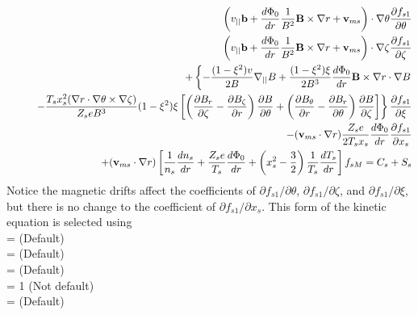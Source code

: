 \begin{eqnarray}
&&\left(v_{||}{\mathbf b} + \frac{d\Phi_0}{dr} \frac{1}{B^2} {\mathbf B}\times\nabla r  + {\mathbf v}_{ms}\right) \cdot \nabla \theta \frac{\partial f_{s1}}{\partial \theta} \\
&&\left(v_{||}{\mathbf b} + \frac{d\Phi_0}{dr} \frac{1}{B^2} {\mathbf B}\times\nabla r  + {\mathbf v}_{ms}\right) \cdot \nabla \zeta \frac{\partial f_{s1}}{\partial \zeta} \nonumber \\
&&+ \left\{ - \frac{(1-\xi^2)v}{2B} \nabla_{||} B
+\frac{(1-\xi^2)\xi}{2B^3} \frac{d\Phi_0}{dr}{\mathbf B}\times\nabla r\cdot\nabla B \right. \nonumber \\
&& \left. \hspace{0.25in} -\frac{T_s x_s^2 (\nabla r\cdot\nabla\theta\times\nabla\zeta)}{Z_s e B^3} (1-\xi^2)\xi
\left[ \left( \frac{\partial B_r}{\partial \zeta} - \frac{\partial B_\zeta}{\partial r}\right)\frac{\partial B}{\partial\theta}
+ \left(\frac{\partial B_\theta}{\partial r} - \frac{\partial B_r}{\partial\theta}\right) \frac{\partial B}{\partial\zeta}\right]
\right\}
 \frac{\partial f_{s1}}{\partial \xi} \nonumber \\
&&-({\mathbf v}_{ms} \cdot\nabla r) \frac{Z_s e}{2 T_s x_s} \frac{d\Phi_0}{dr} \frac{\partial f_{s1}}{\partial x_s} \nonumber \\
&&+ ({\mathbf v}_{ms} \cdot \nabla r) \left[ \frac{1}{n_s} \frac{dn_s}{dr} + \frac{Z_s e}{T_s} \frac{d\Phi_0}{dr} + \left(x_s^2-\frac{3}{2}\right) \frac{1}{T_s} \frac{dT_s}{dr}\right] f_{sM}
 = C_s + S_s \nonumber
\end{eqnarray}
Notice the magnetic drifts affect the coefficients of $\partial f_{s1}/\partial \theta$, $\partial f_{s1}/\partial \zeta$, 
and $\partial f_{s1}/\partial \xi$,
but there is no change to the coefficient of $\partial f_{s1}/\partial x_s$.
This form of the kinetic equation is selected using \\
 = \true  \;\;\; (Default) \\
 = \true \;\;\; (Default) \\
 = \false \;\;\; (Default) \\
 = 1 \;\;\; (Not default) \\
 = \false \;\;\; (Default) %




